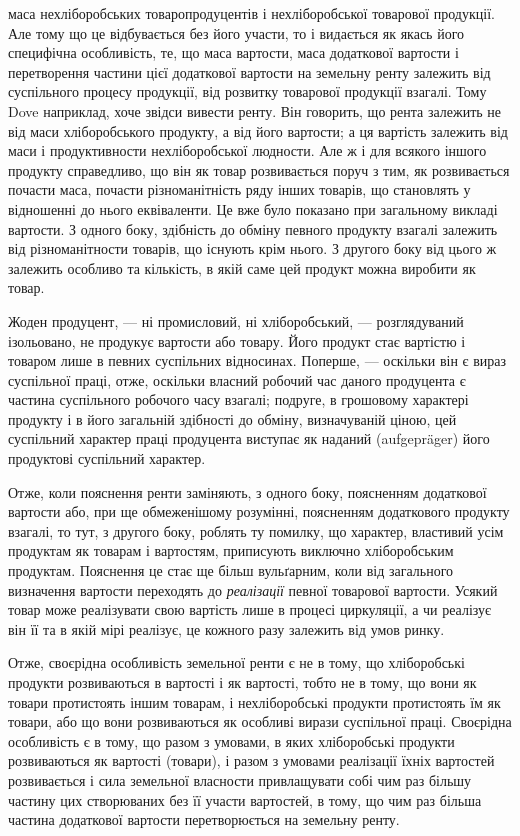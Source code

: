 \parcont{}  %
маса нехліборобських товаропродуцентів і нехліборобської товарової продукції.
Але тому що це відбувається без його участи, то і видається як якась його
специфічна особливість, те, що маса вартости, маса додаткової вартости і перетворення
частини цієї додаткової вартости на земельну ренту залежить від
суспільного процесу продукції, від розвитку товарової продукції взагалі. Тому
Dove наприклад, хоче звідси вивести ренту. Він говорить, що рента залежить
не від маси хліборобського продукту, а від його вартости; а ця вартість залежить
від маси і продуктивности нехліборобської людности. Але ж і для всякого іншого
продукту справедливо, що він як товар розвивається поруч з тим, як розвивається
почасти маса, почасти різноманітність ряду інших товарів, що становлять у відношенні
до нього еквіваленти. Це вже було показано при загальному викладі
вартости. З одного боку, здібність до обміну певного продукту взагалі залежить
від різноманітности товарів, що існують крім нього. З другого боку від цього ж
залежить особливо та кількість, в якій саме цей продукт можна виробити як товар.

Жоден продуцент, — ні промисловий, ні хліборобський, — розглядуваний
ізольовано, не продукує вартости або товару. Його продукт стає вартістю і товаром
лише в певних суспільних відносинах. Поперше, — оскільки він є вираз суспільної
праці, отже, оскільки власний робочий час даного продуцента є частина суспільного
робочого часу взагалі; подруге, в грошовому характері продукту і в його загальній
здібності до обміну, визначуваній ціною, цей суспільний характер праці продуцента
виступає як наданий (aufgepräger) його продуктові суспільний характер.

Отже, коли пояснення ренти заміняють, з одного боку, поясненням додаткової
вартости або, при ще обмеженішому розумінні, поясненням додаткового
продукту взагалі, то тут, з другого боку, роблять ту помилку, що характер, властивий
усім продуктам як товарам і вартостям, приписують виключно хліборобським
продуктам. Пояснення це стає ще більш вульґарним, коли від загального визначення
вартости переходять до \emph{реалізації} певної товарової вартости. Усякий товар
може реалізувати свою вартість лише в процесі циркуляції, а чи реалізує
він її та в якій мірі реалізує, це кожного разу залежить від умов ринку.

Отже, своєрідна особливість земельної ренти є не в тому, що хліборобські
продукти розвиваються в вартості і як вартості, тобто не в тому, що вони як
товари протистоять іншим товарам, і нехліборобські продукти протистоять їм як
товари, або що вони розвиваються як особливі вирази суспільної праці. Своєрідна
особливість є в тому, що разом з умовами, в яких хліборобські продукти
розвиваються як вартості (товари), і разом з умовами реалізації їхніх вартостей
розвивається і сила земельної власности привлащувати собі чим раз більшу
частину цих створюваних без її участи вартостей, в тому, що чим раз більша
частина додаткової вартости перетворюється на земельну ренту.

